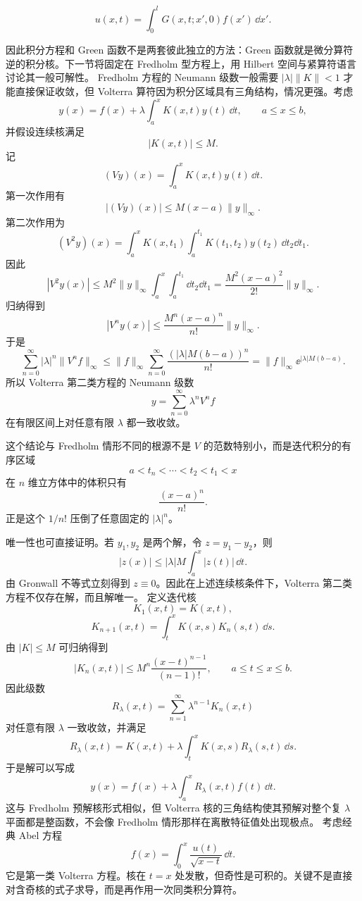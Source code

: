 \[
{
u(x,t)=\int_0^lG(x,t;x',0)f(x')\,\dd x'
}.
\]

因此积分方程和 Green 函数不是两套彼此独立的方法：Green 函数就是微分算符逆的积分核。下一节将固定在 Fredholm 型方程上，用 Hilbert 空间与紧算符语言讨论其一般可解性。
Fredholm 方程的 Neumann 级数一般需要 $|\lambda|\|K\|<1$ 才能直接保证收敛，但 Volterra 算符因为积分区域具有三角结构，情况更强。考虑
\[
y(x)=f(x)+\lambda\int_a^xK(x,t)y(t)\,\dd t,
\qquad a\le x\le b,
\]
并假设连续核满足
\[
|K(x,t)|\le M.
\]
记
\[
(Vy)(x)=\int_a^xK(x,t)y(t)\,\dd t.
\]
第一次作用有
\[
|(Vy)(x)|\le M(x-a)\|y\|_\infty.
\]
第二次作用为
\[
(V^2y)(x)
=\int_a^x\!K(x,t_1)
\int_a^{t_1}\!K(t_1,t_2)y(t_2)\,\dd t_2\dd t_1.
\]
因此
\[
|V^2y(x)|
\le M^2\|y\|_\infty
\int_a^x\int_a^{t_1}\dd t_2\dd t_1
=\frac{M^2(x-a)^2}{2!}\|y\|_\infty.
\]
归纳得到
\begin{equation*}{
|V^ny(x)|
\le \frac{M^n(x-a)^n}{n!}\|y\|_\infty
}.\end{equation*}
于是
\[
\sum_{n=0}^\infty |\lambda|^n\|V^n f\|_\infty
\le \|f\|_\infty
\sum_{n=0}^\infty
\frac{(|\lambda|M(b-a))^n}{n!}
=\|f\|_\infty \ee^{|\lambda|M(b-a)}.
\]
所以 Volterra 第二类方程的 Neumann 级数
\begin{equation*}{
y=\sum_{n=0}^\infty \lambda^nV^nf}\end{equation*}
在有限区间上对任意有限 $\lambda$ 都一致收敛。

这个结论与 Fredholm 情形不同的根源不是 $V$ 的范数特别小，而是迭代积分的有序区域
\[
a<t_n<\cdots<t_2<t_1<x
\]
在 $n$ 维立方体中的体积只有
\[
\frac{(x-a)^n}{n!}.
\]
正是这个 $1/n!$ 压倒了任意固定的 $|\lambda|^n$。

唯一性也可直接证明。若 $y_1,y_2$ 是两个解，令 $z=y_1-y_2$，则
\[
|z(x)|\le |\lambda|M\int_a^x|z(t)|\,\dd t.
\]
由 Gronwall 不等式立刻得到 $z\equiv0$。因此在上述连续核条件下，Volterra 第二类方程不仅存在解，而且解唯一。
定义迭代核
\[
K_1(x,t)=K(x,t),
\]
\[
K_{n+1}(x,t)
=\int_t^xK(x,s)K_n(s,t)\,\dd s.
\]
由 $|K|\le M$ 可归纳得到
\[
|K_n(x,t)|
\le M^n\frac{(x-t)^{n-1}}{(n-1)!},
\qquad a\le t\le x\le b.
\]
因此级数
\[
R_\lambda(x,t)
=\sum_{n=1}^{\infty}\lambda^{n-1}K_n(x,t)
\]
对任意有限 $\lambda$ 一致收敛，并满足
\[
R_\lambda(x,t)
=K(x,t)+\lambda\int_t^xK(x,s)R_\lambda(s,t)\,\dd s.
\]
于是解可以写成
\begin{equation*}{
y(x)=f(x)+\lambda\int_a^xR_\lambda(x,t)f(t)\,\dd t
}.\end{equation*}
这与 Fredholm 预解核形式相似，但 Volterra 核的三角结构使其预解对整个复 $\lambda$ 平面都是整函数，不会像 Fredholm 情形那样在离散特征值处出现极点。
考虑经典 Abel 方程
\begin{equation}
{
f(x)=\int_0^x\frac{u(t)}{\sqrt{x-t}}\,\dd t
}.
\label{eq:abel-first-kind}
\end{equation}
它是第一类 Volterra 方程。核在 $t=x$ 处发散，但奇性是可积的。关键不是直接对含奇核的式子求导，而是再作用一次同类积分算符。

